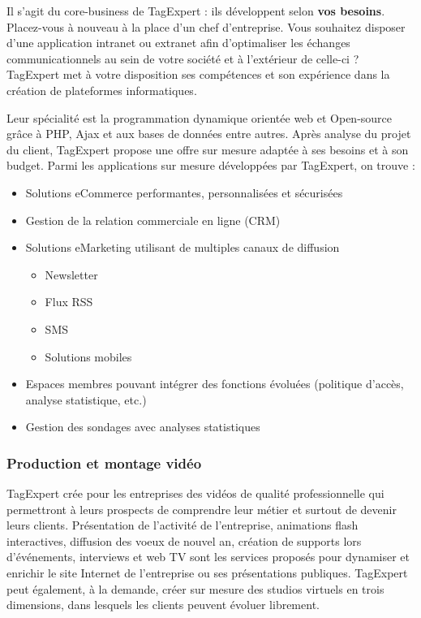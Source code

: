 \documentclass{article}
\begin{document}
\begin{sffamily}
Il s'agit du core-business de TagExpert : ils développent selon \textbf{vos besoins}. Placez-vous à nouveau à la place d'un chef d'entreprise.
Vous souhaitez disposer d'une application intranet ou extranet afin d'optimaliser les échanges communicationnels au sein de votre société et à l'extérieur de celle-ci ?
TagExpert met à votre disposition ses compétences et son expérience dans la création de plateformes informatiques.

Leur spécialité est la programmation dynamique orientée web et Open-source grâce à PHP, Ajax et aux bases de données entre autres. Après analyse du projet du client, 
TagExpert propose une offre sur mesure adaptée à ses besoins et à son budget. Parmi les applications sur mesure développées par TagExpert, on trouve :
\begin{itemize}
\item{Solutions eCommerce performantes, personnalisées et sécurisées}
\item{Gestion de la relation commerciale en ligne (CRM)}
\item{Solutions eMarketing utilisant de multiples canaux de diffusion}
	\begin{itemize}
	\item{Newsletter}
	\item{Flux RSS}
	\item{SMS}
	\item{Solutions mobiles}
	\end{itemize}
\item{Espaces membres pouvant intégrer des fonctions évoluées (politique d'accès, analyse statistique, etc.)}
\item{Gestion des sondages avec analyses statistiques}
\end{itemize}

\subsubsection{Production et montage vidéo}

TagExpert crée pour les entreprises des vidéos de qualité professionnelle qui permettront à leurs prospects de comprendre leur métier et surtout de devenir leurs clients.
Présentation de l'activité de l'entreprise, animations flash interactives, diffusion des voeux de nouvel an, création de supports lors d'événements, interviews et web TV 
sont les services proposés pour dynamiser et enrichir le site Internet de l'entreprise ou ses présentations publiques.
TagExpert peut également, à la demande, créer sur mesure des studios virtuels en trois dimensions, dans lesquels les clients peuvent évoluer librement.\\


\end{sffamily}
\end{document}
